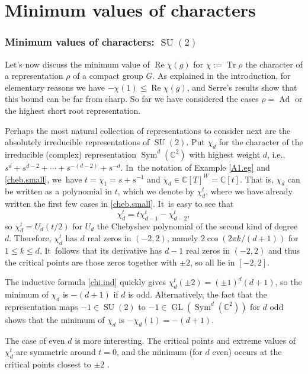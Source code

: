 \documentclass[JEP,XML,SOM,Unicode,NoFloatCountersInSection,published]{cedram}
\theoremstyle{definition}
\newcommand{\C}{\mathbb{C}}
\DeclareMathOperator{\RE}{Re}
\DeclareMathOperator{\GL}{GL}
\DeclareMathOperator{\SU}{SU}
\DeclareMathOperator{\Tr}{Tr}
\DeclareMathOperator{\Ad}{Ad}
\DeclareMathOperator{\Sym}{Sym}
\begin{document}
\part{Minimum values of characters} \label{min.part}

\section{Minimum values of characters: \texorpdfstring{$\SU(2)$}{SU(2)}} \label{SU2.sec}

Let's now discuss the minimum value of $\RE \chi(g)$ for $\chi := \Tr \rho$ the character of a representation $\rho$ of a compact group $G$. As explained in the introduction, for elementary reasons we have $-\chi(1) \le \RE \chi(g)$, and Serre's results show that this bound can be far from sharp. So far we have considered the cases $\rho = \Ad$ or the highest short root representation.

Perhaps the most natural collection of representations to consider next are the absolutely irreducible representations of $\SU(2)$. Put $\chi_d$ for the character of the irreducible (complex) representation $\Sym^d(\C^2)$ with highest weight $d$, i.e., $s^d + s^{d-2} + \cdots + s^{-(d-2)} + s^{-d}$. In~the notation of Example \ref{A1.eg} and \eqref{cheb.small}, we~have $t = \chi_1 = s + s^{-1}$ and $\chi_d \in \C[T]^W = \C[t]$. That is, $\chi_d$ can be written as a polynomial in $t$, which we denote by $\chi_d^t$, where we have already written the first few cases in \eqref{cheb.small}. It~is easy to see that
\begin{equation} \label{chi.ind}
\chi^t_d = t \chi^t_{d-1} - \chi^t_{d-2},
\end{equation}
so $\chi^t_d = U_d(t/2)$ for $U_d$ the Chebyshev polynomial of the second kind of degree $d$.
Therefore, $\chi^t_d$ has $d$ real zeros in $(-2, 2)$, namely $2\cos(2\pi k/(d+1))$ for $1\le k\le d$. It~follows that its derivative
has $d-1$ real zeros in $(-2,2)$ and thus the critical points are those
zeros together with $\pm 2$, so all lie in $[-2,2]$.

The inductive formula \eqref{chi.ind} quickly gives $\chi^t_d(\pm 2) = (\pm 1)^d (d+1)$, so the minimum of $\chi_d$ is $-(d+1)$ if $d$ is odd. Alternatively, the fact that the representation maps $-1 \in \SU(2)$ to $-1 \in \GL(\Sym^d(\C^2))$ for $d$ odd shows that the minimum of $\chi_d$ is $-\chi_d(1) = -(d+1)$.

The case of even $d$ is more interesting. The critical points and extreme values of~$\chi_d^t$ are symmetric around $t = 0$, and the minimum (for $d$ even) occurs at the critical points closest to $\pm 2$ \cite{Cheb}.
\end{document}

